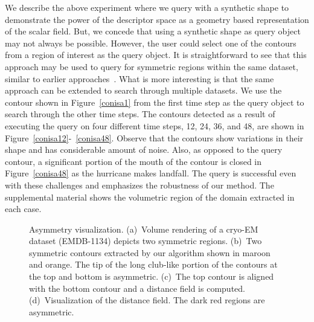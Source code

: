 \documentclass[review,journal]{vgtc}         %
\begin{document}
We describe the above experiment where we query with
a synthetic shape to demonstrate the power of the descriptor space as a geometry based representation 
of the scalar field. But, we concede that using a synthetic shape as query object may not always be 
possible. However, the user could select one of the contours from a region of interest as the query
object. It is straightforward to see that this approach may be used
to query for symmetric regions within the same dataset, similar to earlier approaches~\cite{ThomN13,MasoodTN13}.
What is more interesting is that the same approach can be extended to search through multiple datasets.
We use the contour shown in Figure~\ref{conisa1} from the first time step as the query object to search through 
the other time steps. The contours detected as a result of executing the query on four different time 
steps, 12, 24, 36, and 48, are shown in Figure~\ref{conisa12}-~\ref{conisa48}. Observe that
the contours show variations in their shape and has considerable amount of noise. 
Also, as opposed to the query contour, a significant portion
of the mouth of the contour is closed in Figure~\ref{conisa48} as the hurricane makes landfall.
The query is successful even with these challenges and emphasizes the robustness of our method.
The supplemental material shows the volumetric region of the domain extracted in each case.
\begin{figure*}[t]
	\centering
	\caption{Asymmetry visualization. (a)~Volume rendering of a cryo-EM dataset (EMDB-1134) 
	depicts two symmetric regions. (b)~Two symmetric contours extracted by our algorithm shown
in maroon and orange. The tip of the long club-like portion of the contours at the top and bottom is asymmetric.
(c)~The top contour is aligned with the bottom contour and a distance field is computed. (d)~Visualization
of the distance field. The dark red regions are asymmetric.}
\end{figure*}
\end{document}
